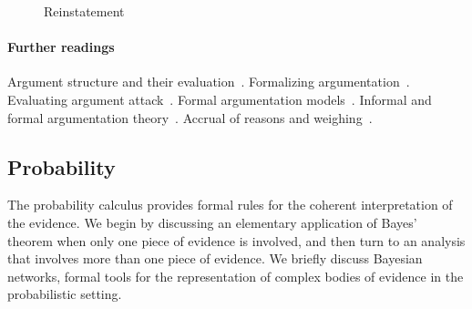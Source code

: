\documentclass[10pt]{article}
\begin{document}
\begin{figure}[bt]
\centering

\caption{Reinstatement\label{fig:reinstatement}}
\end{figure}


\paragraph{Further readings}
Argument structure and their evaluation~\citep{pollock1995}. Formalizing argumentation~\citep{prakkenVreeswijk2002}. Evaluating argument attack~\citep{dung1995}. 
Formal argumentation models~\citep{simariLoui1992, vreeswijk1997, prakken2010, verheij2003deflog, gordonEtal2007}. Informal and formal argumentation theory~\citep{vanEemerenEtal2014}. Accrual of reasons and weighing~\citep{pollock1995,hage1997,verheij1996diss,prakken2005}. 





\subsection{Probability}

The probability calculus provides formal rules for the coherent interpretation of the evidence. We begin by discussing an elementary application of Bayes' 
theorem when only one piece of evidence is involved, and then turn to an analysis that involves more than one piece of evidence. %
We briefly 
discuss Bayesian networks, formal tools for the representation of complex bodies of evidence in the probabilistic setting. 







\end{document}

